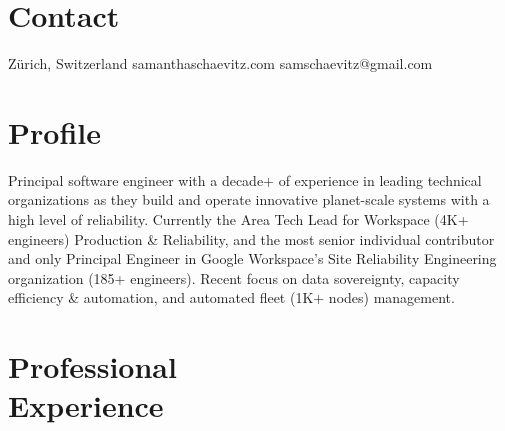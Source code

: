 \documentclass[margin,line]{resume}
\begin{document}
\begin{resume}

  \section{\mysidestyle Contact}

  Z{\"u}rich, Switzerland      \hfil
  samanthaschaevitz.com                     \hfil
  samschaevitz@gmail.com   \vspace{0mm}\\\vspace{-4.5mm}%

  \section{\mysidestyle Profile}

  Principal software engineer with a decade+ of experience in leading technical organizations as they build and
  operate innovative planet-scale systems with a high level of reliability. Currently the Area Tech Lead for Workspace
  (4K+ engineers) Production {\&} Reliability, and the most senior individual contributor and only Principal Engineer
  in Google Workspace’s Site Reliability Engineering organization (185+ engineers). Recent focus on data sovereignty,
  capacity efficiency {\&} automation, and automated fleet (1K+ nodes) management.

  \section{\mysidestyle Professional\\Experience}


\end{resume}
\end{document}
